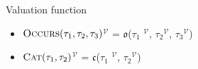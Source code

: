 \begin{defn}Valuation function
	\begin{itemize}
		\item  \textlbrackdbl $\textsc{Occurs}(\tau_1, \tau_2, \tau_3)$\textrbrackdbl$^{\mathcal{V}}$
		      = $\mathfrak{o}$(\textlbrackdbl $\tau_1$ \textrbrackdbl$^{\mathcal{V}}$,
		      \textlbrackdbl $\tau_2$\textrbrackdbl$^{\mathcal{V}}$, \textlbrackdbl $\tau_3$\textrbrackdbl$^{\mathcal{V}}$)

		\item  \textlbrackdbl $\textsc{Cat}(\tau_1, \tau_2)$\textrbrackdbl$^{\mathcal{V}}$
		      = $\mathfrak{c}$(\textlbrackdbl $\tau_1$ \textrbrackdbl$^{\mathcal{V}}$,
		      \textlbrackdbl $\tau_2$\textrbrackdbl$^{\mathcal{V}}$)
	\end{itemize}
\end{defn}
